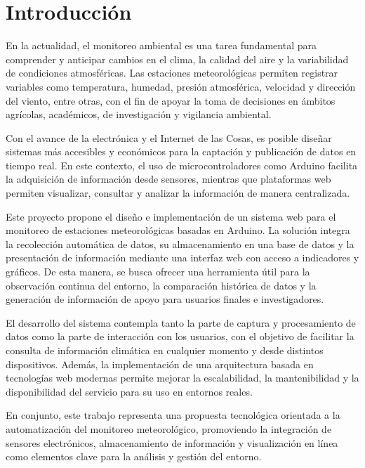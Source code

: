 \section*{Introducción}

En la actualidad, el monitoreo ambiental es una tarea fundamental para comprender y anticipar cambios en el clima, la calidad del aire y la variabilidad de condiciones atmosféricas. Las estaciones meteorológicas permiten registrar variables como temperatura, humedad, presión atmosférica, velocidad y dirección del viento, entre otras, con el fin de apoyar la toma de decisiones en ámbitos agrícolas, académicos, de investigación y vigilancia ambiental.

Con el avance de la electrónica y el Internet de las Cosas, es posible diseñar sistemas más accesibles y económicos para la captación y publicación de datos en tiempo real. En este contexto, el uso de microcontroladores como Arduino facilita la adquisición de información desde sensores, mientras que plataformas web permiten visualizar, consultar y analizar la información de manera centralizada.

Este proyecto propone el diseño e implementación de un sistema web para el monitoreo de estaciones meteorológicas basadas en Arduino. La solución integra la recolección automática de datos, su almacenamiento en una base de datos y la presentación de información mediante una interfaz web con acceso a indicadores y gráficos. De esta manera, se busca ofrecer una herramienta útil para la observación continua del entorno, la comparación histórica de datos y la generación de información de apoyo para usuarios finales e investigadores.

El desarrollo del sistema contempla tanto la parte de captura y procesamiento de datos como la parte de interacción con los usuarios, con el objetivo de facilitar la consulta de información climática en cualquier momento y desde distintos dispositivos. Además, la implementación de una arquitectura basada en tecnologías web modernas permite mejorar la escalabilidad, la mantenibilidad y la disponibilidad del servicio para su uso en entornos reales.

En conjunto, este trabajo representa una propuesta tecnológica orientada a la automatización del monitoreo meteorológico, promoviendo la integración de sensores electrónicos, almacenamiento de información y visualización en línea como elementos clave para la análisis y gestión del entorno.

